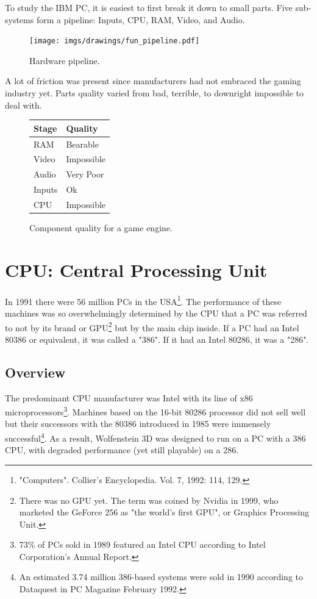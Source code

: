 \documentclass[book.tex]{subfiles}
\begin{document}
\label{chapter_hardware}
To study the IBM PC, it is easiest to first break it down to small parts. Five sub-systems form a pipeline: Inputs, CPU, RAM, Video, and Audio.\\
\begin{figure}[H]
\centering
\texttt{[image: imgs/drawings/fun\_pipeline.pdf]}
\caption{Hardware pipeline.}
\label{fig:digraph}
\end{figure}

A lot of friction was present since manufacturers had not embraced the gaming industry yet. Parts quality varied from  bad, terrible, to downright impossible to deal with.\\
\par

\begin{figure}[H]
\centering
\begin{tabularx}{\textwidth}{ X X  }
  \toprule
  \textbf{Stage} & \textbf{Quality} \\ \bottomrule
  RAM & Bearable \\ 
  Video & Impossible \\ 
  Audio & Very Poor \\ 
  Inputs & Ok \\ 
  CPU & Impossible \\ \bottomrule
\end{tabularx}
\caption{Component quality for a game engine.}
\end{figure}



\section{CPU: Central Processing Unit}
  


  In 1991 there were 56 million PCs in the USA\footnote{"Computers". Collier's Encyclopedia. Vol. 7, 1992: 114, 129.}. The performance of these machines was so overwhelmingly determined by the CPU that a PC was referred to not by its brand or GPU\footnote{There was no GPU yet. The term was coined by Nvidia in 1999, who marketed the GeForce 256 as "the world's first GPU", or Graphics Processing Unit.} but by the main chip inside. If a PC had an Intel 80386 or equivalent, it was called a "386". If it had an Intel 80286, it was a "286".\\
\subsection{Overview}
  The predominant CPU manufacturer was Intel with its line of x86 microprocessors\footnote{73\% of PCs sold in 1989 featured an Intel CPU according to Intel Corporation's Annual Report.}. Machines based on the 16-bit 80286 processor did not sell well but their successors with the 80386 introduced in 1985 were immensely successful\footnote{An estimated 3.74 million 386-based systems were sold in 1990 according to Dataquest in PC Magazine February 1992.}. As a result, Wolfenstein 3D was designed to run on a PC with a 386 CPU, with degraded performance (yet still playable) on a 286.\\
\par
\end{document}
